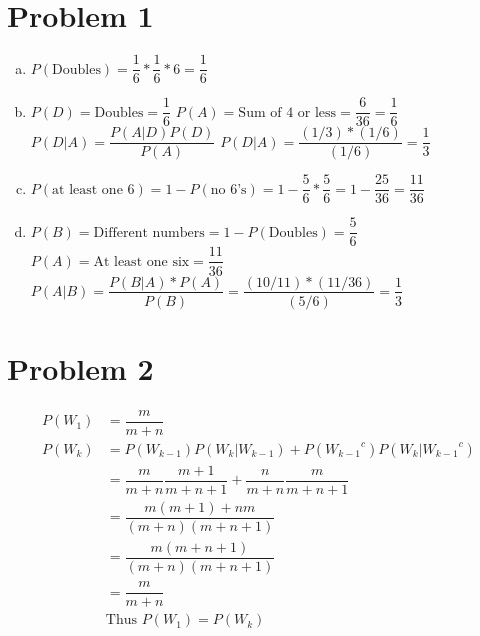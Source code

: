 \documentclass{article}
\begin{document}
\begin{flushleft}
\section*{Problem 1}
\begin{enumerate}[(a)]
\item $P(\text{Doubles})=\dfrac{1}{6}*\dfrac{1}{6}*6=\dfrac{1}{6}$
\item $P(D) = \text{Doubles}=\dfrac{1}{6}$ \quad $P(A)=\text{Sum of 4 or less}=\dfrac{6}{36}=\dfrac{1}{6}$\medbreak
$P(D|A)=\dfrac{P(A|D)P(D)}{P(A)}$\medbreak
$P(D|A)=\dfrac{(1/3)*(1/6)}{(1/6)}=\dfrac{1}{3}$
\item $P(\text{at least one 6})=1-P(\text{no 6's})=1-\dfrac{5}{6}*\dfrac{5}{6}=1-\dfrac{25}{36}=\dfrac{11}{36}$
\item $P(B)=\text{Different numbers}=1-P(\text{Doubles}) =\dfrac{5}{6}$ \quad $P(A)=\text{At least one six}=\dfrac{11}{36}$\medbreak
$P(A|B)= \dfrac{P(B|A)*P(A)}{P(B)}=\dfrac{(10/11)*(11/36)}{(5/6)}=\dfrac{1}{3}$
\end{enumerate}

\section*{Problem 2}
\begin{align*}
P(W_1)&=\dfrac{m}{m+n}\\
P(W_k)&=P(W_{k-1})P(W_k|W_{k-1})+P({W_{k-1}}^c)P(W_k|{W_{k-1}}^c)\\
&=\dfrac{m}{m+n}\dfrac{m+1}{m+n+1}+\dfrac{n}{m+n}\dfrac{m}{m+n+1}\\
&=\dfrac{m(m+1)+nm}{(m+n)(m+n+1)}\\
&=\dfrac{m(m+n+1)}{(m+n)(m+n+1)}\\
&=\dfrac{m}{m+n}\\
&\text{Thus } P(W_1)=P(W_k)
\end{align*}
\pagebreak

\end{flushleft}
\end{document}
